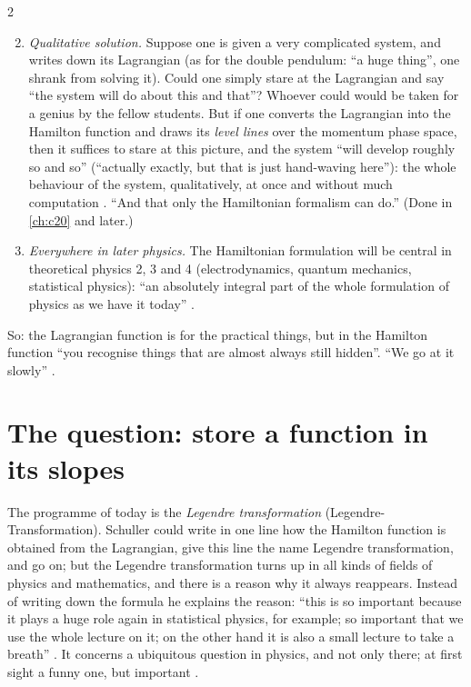 \begin{paracol}{2}
\begin{enumerate}\setcounter{enumi}{1}
  \item \emph{Qualitative solution.} Suppose one is given a very complicated system, and writes down its Lagrangian (as for the double pendulum: ``a huge thing'', one shrank from solving it). Could one simply stare at the Lagrangian and say ``the system will do about this and that''? Whoever could would be taken for a genius by the fellow students. But if one converts the Lagrangian into the Hamilton function and draws its \emph{level lines} over the momentum phase space, then it suffices to stare at this picture, and the system ``will develop roughly so and so'' (``actually exactly, but that is just hand-waving here''): the whole behaviour of the system, qualitatively, at once and without much computation . ``And that only the Hamiltonian formalism can do.'' (Done in \cref{ch:c20} and later.)
  \item \emph{Everywhere in later physics.} The Hamiltonian formulation will be central in theoretical physics 2, 3 and 4 (electrodynamics, quantum mechanics, statistical physics): ``an absolutely integral part of the whole formulation of physics as we have it today'' .
\end{enumerate}
So: the Lagrangian function is for the practical things, but in the Hamilton function ``you recognise things that are almost always still hidden''. ``We go at it slowly'' .

\section{The question: store a function in its slopes}\label{sec:lt-question}

The programme of today is the \emph{Legendre transformation} (Legendre-Transformation). Schuller could write in one line how the Hamilton function is obtained from the Lagrangian, give this line the name Legendre transformation, and go on; but the Legendre transformation turns up in all kinds of fields of physics and mathematics, and there is a reason why it always reappears. Instead of writing down the formula he explains the reason: ``this is so important because it plays a huge role again in statistical physics, for example; so important that we use the whole lecture on it; on the other hand it is also a small lecture to take a breath'' . It concerns a ubiquitous question in physics, and not only there; at first sight a funny one, but important .


\end{paracol}
